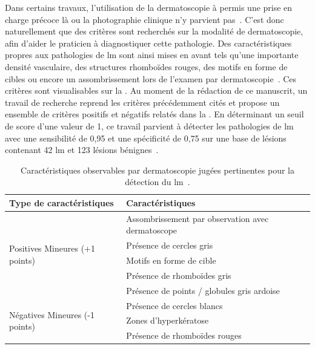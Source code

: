 Dans certains travaux, l'utilisation de la dermatoscopie à permis une prise en charge précoce là ou la photographie clinique n'y parvient pas~\cite{Stante2005}. C'est donc naturellement que des critères sont recherchés sur la modalité de dermatoscopie, afin d'aider le praticien à diagnostiquer cette pathologie. Des caractéristiques propres aux pathologies de \gls{lm} sont ainsi mises en avant tels qu'une importante densité vasculaire, des structures rhomboïdes rouges, des motifs en forme de cibles ou encore un assombrissement lors de l'examen par dermatoscopie~\cite{Pralong2012}. Ces critères sont visualisables sur la . Au moment de la rédaction de ce manuscrit, un travail de recherche reprend les critères précédemment cités et propose un ensemble de critères positifs et négatifs relatés dans la . En déterminant un seuil de score d'une valeur de 1, ce travail parvient à détecter les pathologies de \gls{lm} avec une sensibilité de 0,95 et une spécificité de 0,75 sur une base de lésions contenant 42 \gls{lm} et 123 lésions bénignes~\cite{Ozbagcivan2019}.\par

\begin{table}[H]
    \centering
    \begin{tabular}{ll}
        \toprule
        Type de caractéristiques                        & Caractéristiques                                              \\\hline
        \multirow{5}{*}{Positives Mineures (+1 points)} & Assombrissement par observation avec dermatoscope             \\\cline{2-2}
                                                        & Présence de cercles gris                                      \\\cline{2-2}
                                                        & Motifs en forme de cible                                      \\\cline{2-2}
                                                        & Présence de rhomboïdes gris                                   \\\cline{2-2}
                                                        & Présence de points / globules gris ardoise                    \\\midrule
        \multirow{3}{*}{Négatives Mineures (-1 points)} & Présence de cercles blancs                                    \\\cline{2-2}
                                                        & Zones d'hyperkératose                                         \\\cline{2-2}
                                                        & Présence de rhomboïdes rouges                                 \\\bottomrule
    \end{tabular}
    \caption{Caractéristiques observables par dermatoscopie jugées pertinentes pour la détection du \gls{lm}~\cite{Ozbagcivan2019}.}
    \label{tab:dermoscopy_algorithm_lentigo}
\end{table}\par

